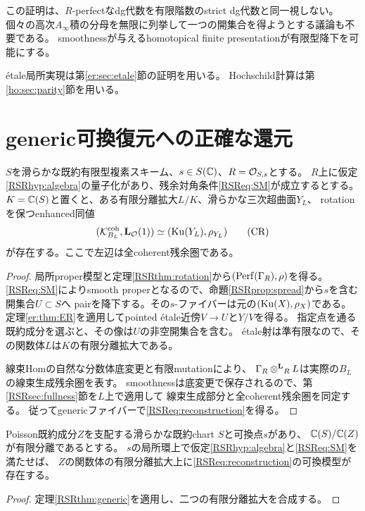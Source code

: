 \begin{remark}
この証明は、$R$-perfectなdg代数を有限階数のstrict dg代数と同一視しない。
個々の高次$A_\infty$積の分母を無限に列挙して一つの開集合を得ようとする議論も不要である。
smoothnessが与えるhomotopical finite presentationが有限型降下を可能にする。
\end{remark}

étale局所実現は第\ref{er:sec:etale}節の証明を用いる。
Hochschild計算は第\ref{ho:sec:parity}節を用いる。

\section{generic可換復元への正確な還元}\label{RSRsec:reconstruction}
\begin{theorem}[局所saturationからgeneric復元へ]\label{RSRthm:generic}
$S$を滑らかな既約有限型複素スキーム、$s\in S(\mathbb C)$、$R=\mathcal O_{S,s}$とする。
$R$上に仮定\ref{RSRhyp:algebra}の量子化があり、残余対角条件\eqref{RSReq:SM}が成立するとする。
$K=\mathbb C(S)$と置くと、ある有限分離拡大$L/K$、滑らかな三次超曲面$Y_L$、
rotationを保つenhanced同値
\[
 (\mathcal K_{B_L}^{\mathrm{coh}},\mathbf L_{\mathcal O}(1))
       \simeq (\operatorname{Ku}(Y_L),\rho_{Y_L})
 \tag{CR}\label{RSReq:reconstruction}
\]
が存在する。ここで左辺は全coherent残余圏である。
\end{theorem}
\begin{proof}
局所proper模型と定理\ref{RSRthm:rotation}から$(\operatorname{Perf}(\Gamma_R),\rho)$を得る。
\eqref{RSReq:SM}によりsmooth properとなるので、命題\ref{RSRprop:spread}から$s$を含む開集合$U\subset S$へ
pairを降下する。その$s$-ファイバーは元の$(\operatorname{Ku}(X),\rho_X)$である。
定理\ref{er:thm:ER}を適用してpointed étale近傍$V\to U$と$Y/V$を得る。
指定点を通る既約成分を選ぶと、その像は$U$の非空開集合を含む。
étale射は準有限なので、その関数体$L$は$K$の有限分離拡大である。

線束Homの自然な分数体底変更と有限mutationにより、
$\Gamma_R\mathbin{\otimes^{\mathbf L}}_RL$は実際の$B_L$の線束生成残余圏を表す。
smoothnessは底変更で保存されるので、第\ref{RSRsec:fullness}節を$L$上で適用して
線束生成部分と全coherent残余圏を同定する。
従ってgenericファイバーで\eqref{RSReq:reconstruction}を得る。
\end{proof}

\begin{corollary}[Poisson成分に対する適用範囲]\label{RSRcor:component}
Poisson既約成分$Z$を支配する滑らかな既約chart $S$と可換点$s$があり、
$\mathbb C(S)/\mathbb C(Z)$が有限分離であるとする。
$s$の局所環上で仮定\ref{RSRhyp:algebra}と\eqref{RSReq:SM}を満たせば、
$Z$の関数体の有限分離拡大上に\eqref{RSReq:reconstruction}の可換模型が存在する。
\end{corollary}
\begin{proof}
定理\ref{RSRthm:generic}を適用し、二つの有限分離拡大を合成する。
\end{proof}

